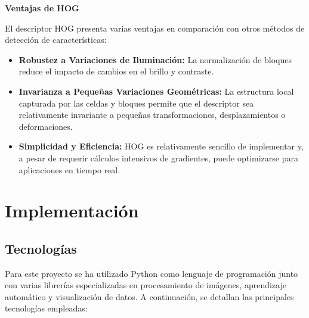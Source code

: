 \documentclass[a4paper]{article}
\begin{document}
\par\vspace{0.5cm}
\textbf{Ventajas de HOG}
\par\vspace{0.5cm}

El descriptor HOG presenta varias ventajas en comparación con otros métodos de detección de características:

\begin{itemize}
    \item \textbf{Robustez a Variaciones de Iluminación:}
    La normalización de bloques reduce el impacto de cambios en el brillo y contraste.
    \item \textbf{Invarianza a Pequeñas Variaciones Geométricas:}
    La estructura local capturada por las celdas y bloques permite que el descriptor sea relativamente invariante a pequeñas transformaciones, desplazamientos o deformaciones.
    \item \textbf{Simplicidad y Eficiencia:}
    HOG es relativamente sencillo de implementar y, a pesar de requerir cálculos intensivos de gradientes, puede optimizarse para aplicaciones en tiempo real. 
\end{itemize}

\par\vspace{0.5cm}


\newpage

\section{Implementación}

\subsection{Tecnologías}

Para este proyecto se ha utilizado Python como lenguaje de programación junto con varias librerías especializadas en procesamiento de imágenes, aprendizaje automático y visualización de datos. A continuación, se detallan las principales tecnologías empleadas:
\end{document}
